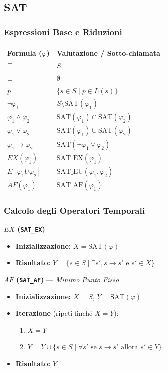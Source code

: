 \documentclass{article}
\begin{document}
\newpage

\subsection*{SAT}

\subsubsection*{Espressioni Base e Riduzioni}
\begin{table}[H]
\centering
\begin{tabular}{|l|l|}
\hline
\textbf{Formula ($\varphi$)} & \textbf{Valutazione / Sotto-chiamata} \\ \hline
$\top$ & $S$ \\ \hline
$\bot$ & $\emptyset$ \\ \hline
$p$ & $\{s \in S \mid p \in L(s)\}$ \\ \hline
$\neg\varphi_1$ & $S \setminus \text{SAT}(\varphi_1)$ \\ \hline
$\varphi_1 \land \varphi_2$ & $\text{SAT}(\varphi_1) \cap \text{SAT}(\varphi_2)$ \\ \hline
$\varphi_1 \lor \varphi_2$ & $\text{SAT}(\varphi_1) \cup \text{SAT}(\varphi_2)$ \\ \hline
$\varphi_1 \to \varphi_2$ & $\text{SAT}(\neg\varphi_1 \lor \varphi_2)$ \\ \hline
$EX(\varphi_1)$ & $\text{SAT\_EX}(\varphi_1)$ \\ \hline
$E[\varphi_1 U \varphi_2]$ & $\text{SAT\_EU}(\varphi_1, \varphi_2)$ \\ \hline
$AF(\varphi_1)$ & $\text{SAT\_AF}(\varphi_1)$ \\ \hline
\end{tabular}
\end{table}


\subsubsection*{Calcolo degli Operatori Temporali}

\textbf{$EX$ (\texttt{SAT\_EX})}
\begin{itemize}
    \item \textbf{Inizializzazione:} $X = \text{SAT}(\varphi)$
    \item \textbf{Risultato:} $Y = \{s \in S \mid \exists s', s \to s' \text{ e } s' \in X\}$
\end{itemize}

\textbf{$AF$ (\texttt{SAT\_AF})} --- \textit{Minimo Punto Fisso}
\begin{itemize}
    \item \textbf{Inizializzazione:} $X = S$, $Y = \text{SAT}(\varphi)$
    \item \textbf{Iterazione} (ripeti finché $X = Y$):
    \begin{enumerate}
        \item $X = Y$
        \item $Y = Y \cup \{s \in S \mid \forall s' \text{ se } s \to s' \text{ allora } s' \in Y\}$
    \end{enumerate}
    \item \textbf{Risultato:} $Y$
\end{itemize}
\end{document}
